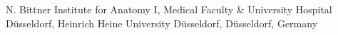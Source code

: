 
                {N. Bittner}
                {Institute for Anatomy I, Medical Faculty \& University Hospital Düsseldorf, Heinrich Heine University Düsseldorf, Düsseldorf, Germany}
                